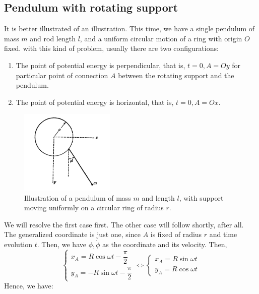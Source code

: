 \subsection{Pendulum with rotating support}
It is better illustrated of an illustration. This time, we have a single pendulum of mass $m$ and rod length $l$, and a uniform circular motion of a ring with origin $O$ fixed. with this kind of problem, usually there are two configurations:
\begin{enumerate}[noitemsep,topsep=1pt]
    \item The point of potential energy is perpendicular, that is, $t=0, A= Oy$ for particular point of connection $A$ between the rotating support and the pendulum. 
    \item The point of potential energy is horizontal, that is, $t=0, A=Ox$. 
\end{enumerate} 
\begin{figure}[htb]
    \centering
    \includegraphics[width=0.4\textwidth]{img/pendulumcirsupport.png}
    \caption{Illustration of a pendulum of mass $m$ and length $l$, with support moving uniformly on a circular ring of radius $r$.}
\end{figure}
We will resolve the first case first. The other case will follow shortly, after all. The generalized coordinate is just one, since $A$ is fixed of radius $r$ and time evolution $t$. Then, we have $\phi, \dot{\phi}$ as the coordinate and its velocity. Then, 
\begin{equation}
    \begin{cases}
        x_{A} = R\cos{\omega t - \dfrac{\pi}{2}}\\
        y_{A} = -R\sin{\omega t - \dfrac{\pi}{2}}
    \end{cases} \Leftrightarrow 
    \begin{cases}
        x_{A} = R\sin{\omega t}\\
        y_{A} = R\cos{\omega t}
    \end{cases}
\end{equation}
Hence, we have: 
